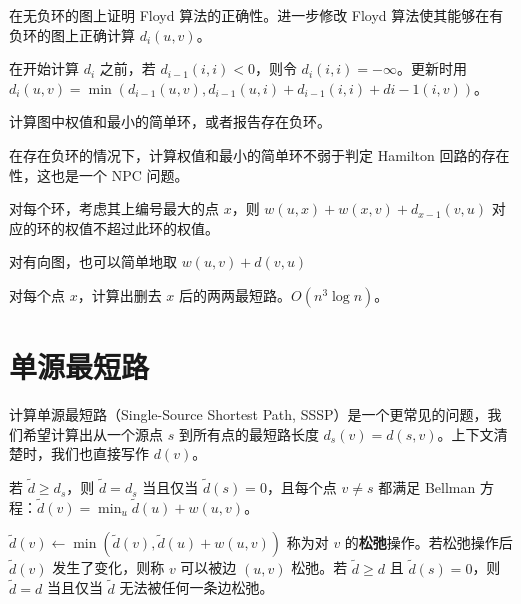 \begin{exercise}
    在无负环的图上证明 Floyd 算法的正确性。进一步修改 Floyd 算法使其能够在有负环的图上正确计算 $d_i(u,v)$。
\end{exercise}
\begin{solution}
    在开始计算 $d_i$ 之前，若 $d_{i-1}(i,i)<0$，则令 $d_i(i,i)=-\infty$。更新时用 $d_i(u,v)=\min(d_{i-1}(u,v),d_{i-1}(u,i)+d_{i-1}(i,i)+d{i-1}(i,v))$。
    
\end{solution}

\begin{exercise}
    计算图中权值和最小的简单环，或者报告存在负环。
\end{exercise}
\begin{remark}
    在存在负环的情况下，计算权值和最小的简单环不弱于判定 Hamilton 回路的存在性，这也是一个 NPC 问题。
\end{remark}
\begin{solution}
    对每个环，考虑其上编号最大的点 $x$，则 $w(u,x)+w(x,v)+d_{x-1}(v,u)$ 对应的环的权值不超过此环的权值。

    对有向图，也可以简单地取 $w(u,v)+d(v,u)$
\end{solution}

\begin{exercise}
    对每个点 $x$，计算出删去 $x$ 后的两两最短路。$O(n^3\log n)$。
\end{exercise}

\section{单源最短路}

计算单源最短路（Single-Source Shortest Path, SSSP）是一个更常见的问题，我们希望计算出从一个源点 $s$ 到所有点的最短路长度 $d_s(v)=d(s,v)$。上下文清楚时，我们也直接写作 $d(v)$。


\begin{lemma}
    若 $\tilde d\ge d_s$，则 $\tilde d=d_s$ 当且仅当 $\tilde d(s)=0$，且每个点 $v\ne s$ 都满足 Bellman 方程：$\tilde d(v)=\min_{u}\tilde d(u)+w(u,v)$。

    $\tilde d(v)\gets \min(\tilde d(v),\tilde d(u)+w(u,v))$ 称为对 $v$ 的\textbf{松弛}操作。若松弛操作后 $\tilde d(v)$ 发生了变化，则称 $v$ 可以被边 $(u,v)$ 松弛。若 $\tilde d\ge d$ 且 $\tilde d(s)=0$，则 $\tilde d=d$ 当且仅当 $\tilde d$ 无法被任何一条边松弛。
\end{lemma}

